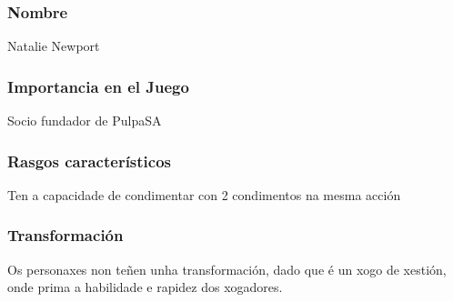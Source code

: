 \documentclass{report}  %
\begin{document}
\subsubsection{Nombre}
Natalie Newport
\subsubsection{Importancia en el Juego}
Socio fundador de PulpaSA
\subsubsection{Rasgos característicos}
Ten a capacidade de condimentar con 2 condimentos na mesma acción
\subsubsection{Transformación}
Os personaxes non teñen unha transformación, dado que é un xogo de xestión, onde prima a habilidade e rapidez dos xogadores.
\end{document}
